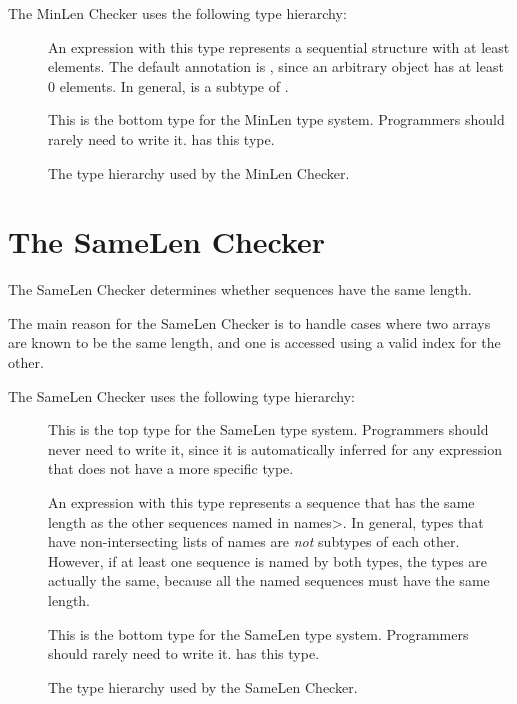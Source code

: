 The MinLen Checker uses the following type hierarchy:

\begin{description}
\item[]
  An expression with this type represents a sequential structure
  with at least  elements.  The default annotation is
  , since an arbitrary object has at least 0 elements.
  In general,  is a subtype of .
\item[]
  This is the bottom type for the MinLen type system.
  Programmers should rarely need to write it.
   has this type.
  \end{description}

\begin{figure}
  \caption{The type hierarchy used by the MinLen Checker.}
  \label{fig-minlen-types}
\end{figure}

\section{The SameLen Checker\label{index-samelen}}

The SameLen Checker determines whether sequences have the same length.

The main reason for the SameLen Checker is to handle cases where two
arrays are known to be the same length, and one is accessed using a
valid index for the other.

The SameLen Checker uses the following type hierarchy:

\begin{description}
  \item[]
  This is the top type for the SameLen type system.
  Programmers should never need to write it, since it
  is automatically inferred for any expression that does
  not have a more specific type.
\item[]
  An expression with this type represents a sequence that has the
  same length as the other sequences named in \<names>. In general,
   types that have non-intersecting lists of names
  are \textit{not} subtypes of each other. However, if at least one
  sequence is named by both types, the types are actually the same,
  because all the named sequences must have the same length.
\item[]
  This is the bottom type for the SameLen type system.
  Programmers should rarely need to write it.
   has this type.
  \end{description}

\begin{figure}
  \caption{The type hierarchy used by the SameLen Checker.}
  \label{fig-samelen-types}
\end{figure}

